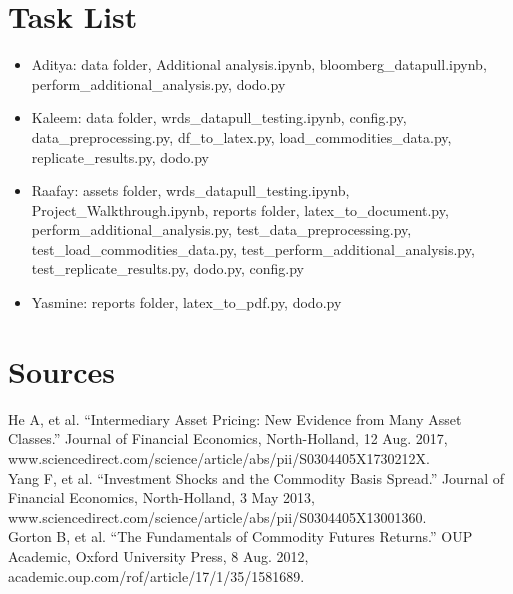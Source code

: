\documentclass{article}
\begin{document}
\section{Task List}

\begin{itemize}
    \item Aditya: data folder, Additional analysis.ipynb, bloomberg\_datapull.ipynb, perform\_additional\_analysis.py, dodo.py
    \item Kaleem: data folder, wrds\_datapull\_testing.ipynb, config.py, data\_preprocessing.py, df\_to\_latex.py, load\_commodities\_data.py, replicate\_results.py, dodo.py
    \item Raafay: assets folder, wrds\_datapull\_testing.ipynb, Project\_Walkthrough.ipynb, reports folder, latex\_to\_document.py, perform\_additional\_analysis.py, test\_data\_preprocessing.py, test\_load\_commodities\_data.py, test\_perform\_additional\_analysis.py, test\_replicate\_results.py, dodo.py, config.py
    \item Yasmine: reports folder, latex\_to\_pdf.py, dodo.py
\end{itemize}












\section{Sources}
He A, et al. “Intermediary Asset Pricing: New Evidence from Many Asset Classes.” Journal of Financial Economics, North-Holland, 12 Aug. 2017, www.sciencedirect.com/science/article/abs/pii/S0304405X1730212X. 
\\


Yang F, et al. “Investment Shocks and the Commodity Basis Spread.” Journal of Financial Economics, North-Holland, 3 May 2013, www.sciencedirect.com/science/article/abs/pii/S0304405X13001360. 
\\


Gorton B, et al. “The Fundamentals of Commodity Futures Returns.” OUP Academic, Oxford University Press, 8 Aug. 2012, academic.oup.com/rof/article/17/1/35/1581689. 

\end{document}
